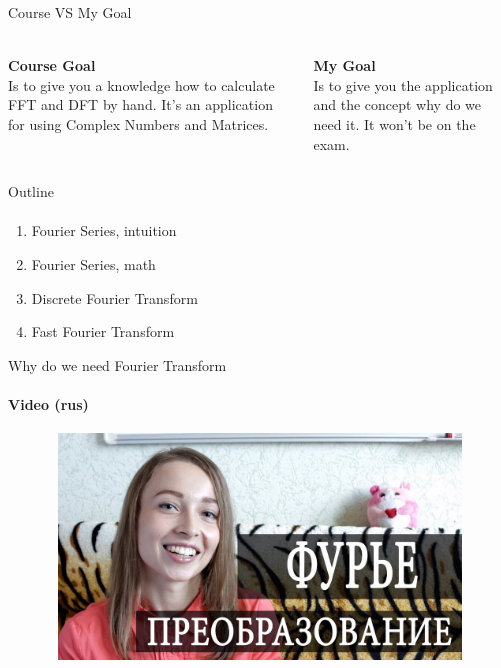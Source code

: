 \documentclass[aspectratio=169]{beamer}
\begin{document}
\begin{frame}[t]{Course VS My Goal}
\framesubtitle{}
\Large
    \begin{columns}[T,onlytextwidth]
        \begin{column}{0.49\textwidth}
            \textbf{Course Goal} \\
            Is to give you a knowledge how to calculate FFT and DFT by hand. It's an application for using Complex Numbers and Matrices.
        \end{column}
        \begin{column}{0.49\textwidth}
            \textbf{My Goal} \\ 
            Is to give you the application and the concept why do we need it. It won't be on the exam.
        \end{column}
    \end{columns}
\end{frame}

\begin{frame}[t]{Outline}
\framesubtitle{}
    \Large
    \begin{enumerate}
        \item Fourier Series, intuition
        \item Fourier Series, math
        \item Discrete Fourier Transform
        \item Fast Fourier Transform
    \end{enumerate}
\end{frame}

\begin{frame}[t]{Why do we need Fourier Transform}
    \framesubtitle{Video (rus)}
    \vspace{-0.6cm}
    \begin{figure}[H]
        \href{https://youtu.be/Vaa1BVGhpxI}{
            \centering\includegraphics[height=6cm,width=1\textwidth,keepaspectratio]{wdwnfourier_rus.jpg}}
        \label{fig:file_name}
    \end{figure}
\end{frame}
\end{document}

